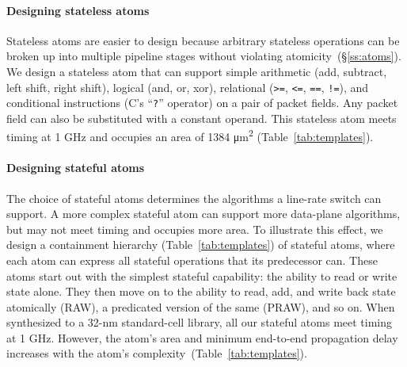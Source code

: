 \paragraph{Designing stateless atoms}
Stateless atoms are easier to design because arbitrary stateless operations can
be broken up into multiple pipeline stages without violating
atomicity~(\S\ref{ss:atoms}). We design a stateless atom that can support
simple arithmetic (add, subtract, left shift, right shift), logical (and, or,
xor), relational ({\tt >=}, {\tt <=}, {\tt ==}, {\tt !=}), and conditional
instructions (C's ``{\tt ?}'' operator) on a pair of packet fields. Any packet
field can also be substituted with a constant operand. This stateless atom
meets timing at 1 GHz and occupies an area of 1384 \si{\micro\meter\squared}
(Table~\ref{tab:templates}).

\paragraph{Designing stateful atoms}
The choice of stateful atoms determines the algorithms a line-rate switch can
support. A more complex stateful atom can support more data-plane algorithms,
but may not meet timing and occupies more area. To illustrate this effect, we
design a containment hierarchy (Table~\ref{tab:templates}) of stateful atoms,
where each atom can express all stateful operations that its predecessor can.
These atoms start out with the simplest stateful capability: the ability to
read or write state alone.  They then move on to the ability to read, add, and
write back state atomically (RAW), a predicated version of the same (PRAW), and
so on. When synthesized to a 32-nm standard-cell library, all our stateful
atoms meet timing at 1 GHz.  However, the atom's area and minimum end-to-end
propagation delay increases with the atom's
complexity~(Table~\ref{tab:templates}).


